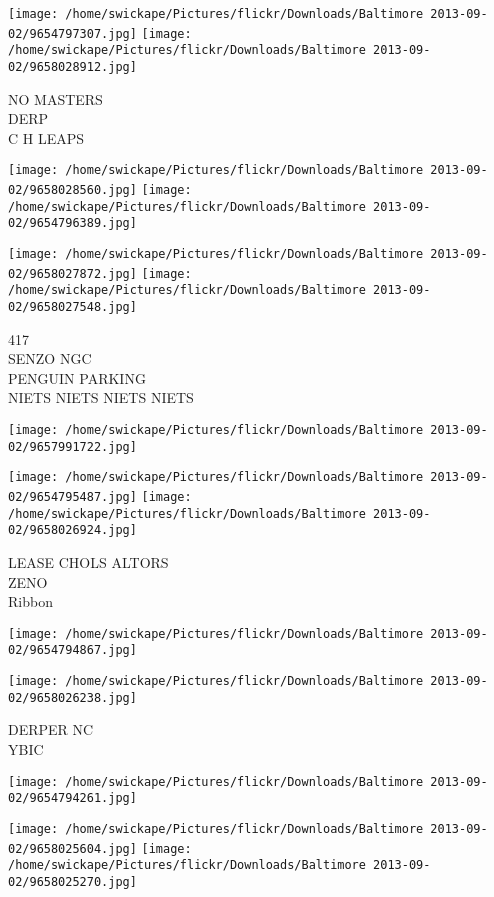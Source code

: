 \documentclass[10pt,letterpaper]{article}
\begin{document}
\vspace{0.25in}
\texttt{[image: /home/swickape/Pictures/flickr/Downloads/Baltimore 2013-09-02/9654797307.jpg]}
\texttt{[image: /home/swickape/Pictures/flickr/Downloads/Baltimore 2013-09-02/9658028912.jpg]}

NO MASTERS\\
DERP\\
C H LEAPS
\pagebreak

\texttt{[image: /home/swickape/Pictures/flickr/Downloads/Baltimore 2013-09-02/9658028560.jpg]}
\texttt{[image: /home/swickape/Pictures/flickr/Downloads/Baltimore 2013-09-02/9654796389.jpg]}

\texttt{[image: /home/swickape/Pictures/flickr/Downloads/Baltimore 2013-09-02/9658027872.jpg]}
\texttt{[image: /home/swickape/Pictures/flickr/Downloads/Baltimore 2013-09-02/9658027548.jpg]}

417\\
SENZO NGC\\
PENGUIN PARKING\\
NIETS NIETS NIETS NIETS
\pagebreak

\texttt{[image: /home/swickape/Pictures/flickr/Downloads/Baltimore 2013-09-02/9657991722.jpg]}

\vspace{0.25in}
\texttt{[image: /home/swickape/Pictures/flickr/Downloads/Baltimore 2013-09-02/9654795487.jpg]}
\texttt{[image: /home/swickape/Pictures/flickr/Downloads/Baltimore 2013-09-02/9658026924.jpg]}

LEASE CHOLS ALTORS\\
ZENO\\
Ribbon
\pagebreak

\texttt{[image: /home/swickape/Pictures/flickr/Downloads/Baltimore 2013-09-02/9654794867.jpg]}

\vspace{0.25in}
\texttt{[image: /home/swickape/Pictures/flickr/Downloads/Baltimore 2013-09-02/9658026238.jpg]}

DERPER NC\\
YBIC
\pagebreak

\texttt{[image: /home/swickape/Pictures/flickr/Downloads/Baltimore 2013-09-02/9654794261.jpg]}

\vspace{0.25in}
\texttt{[image: /home/swickape/Pictures/flickr/Downloads/Baltimore 2013-09-02/9658025604.jpg]}
\texttt{[image: /home/swickape/Pictures/flickr/Downloads/Baltimore 2013-09-02/9658025270.jpg]}
\end{document}
